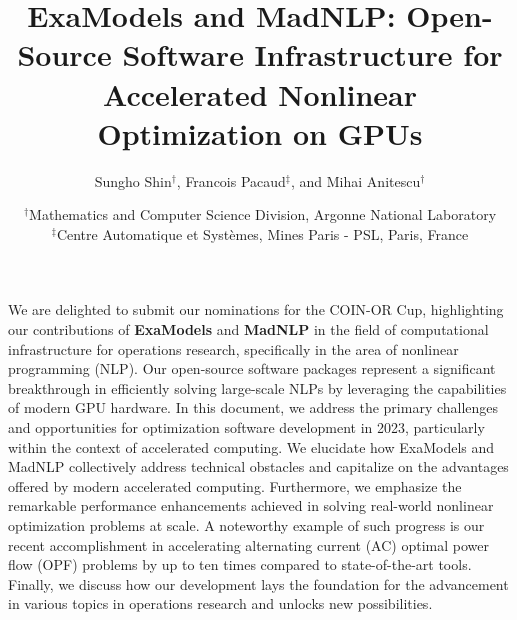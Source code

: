 
\usepackage{wrapfig}
\title{ExaModels and MadNLP: Open-Source Software Infrastructure for Accelerated Nonlinear Optimization on GPUs}
\author{Sungho Shin$^\dag$, Francois Pacaud$^\ddag$, and Mihai Anitescu$^\dag$} 
\date{\small
  $^\dag$Mathematics and Computer Science Division, Argonne National Laboratory\\
  $^\ddag$Centre Automatique et Systèmes, Mines Paris - PSL, Paris, France
}

\maketitle 

We are delighted to submit our nominations for the COIN-OR Cup,
highlighting our contributions of {\bf ExaModels} and {\bf MadNLP} in the field of
computational infrastructure for operations research, specifically in
the area of nonlinear programming (NLP). Our open-source software
packages represent a significant breakthrough in efficiently solving
large-scale NLPs by leveraging the capabilities of modern GPU
hardware.  In this document, we address the primary challenges and
opportunities for optimization software development in 2023,
particularly within the context of accelerated computing. We elucidate
how ExaModels and MadNLP collectively address technical obstacles and
capitalize on the advantages offered by modern accelerated
computing. Furthermore, we emphasize the remarkable performance
enhancements achieved in solving real-world nonlinear optimization
problems at scale. A noteworthy example of such progress is our recent
accomplishment in accelerating alternating current (AC) optimal power
flow (OPF) problems by up to ten times compared to state-of-the-art
tools. Finally, we discuss how our development lays the foundation for
the advancement in various topics in operations research and unlocks
new possibilities.

